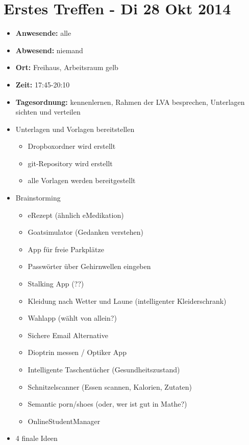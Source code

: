 \section{Erstes Treffen - Di 28 Okt
2014}\label{erstes-treffen---di-28-okt-2014}

\begin{itemize}
\item
  \textbf{Anwesende:} alle
\item
  \textbf{Abwesend:} niemand
\item
  \textbf{Ort:} Freihaus, Arbeitsraum gelb
\item
  \textbf{Zeit:} 17:45-20:10
\item
  \textbf{Tagesordnung:} kennenlernen, Rahmen der LVA besprechen,
  Unterlagen sichten und verteilen
\item
  Unterlagen und Vorlagen bereitstellen

  \begin{itemize}
  \itemsep1pt\parskip0pt
  \item
    Dropboxordner wird erstellt
  \item
    git-Repository wird erstellt
  \item
    alle Vorlagen werden bereitgestellt
  \end{itemize}
\item
  Brainstorming

  \begin{itemize}
  \itemsep1pt\parskip0pt
  \item
    eRezept (ähnlich eMedikation)
  \item
    Goatsimulator (Gedanken verstehen)
  \item
    App für freie Parkplätze
  \item
    Passwörter über Gehirnwellen eingeben
  \item
    Stalking App (??)
  \item
    Kleidung nach Wetter und Laune (intelligenter Kleiderschrank)
  \item
    Wahlapp (wählt von allein?)
  \item
    Sichere Email Alternative
  \item
    Dioptrin messen / Optiker App
  \item
    Intelligente Taschentücher (Gesundheitszustand)
  \item
    Schnitzelscanner (Essen scannen, Kalorien, Zutaten)
  \item
    Semantic porn/shoes (oder, wer ist gut in Mathe?)
  \item
    OnlineStudentManager
  \end{itemize}
\item
  4 finale Ideen


\end{itemize}
